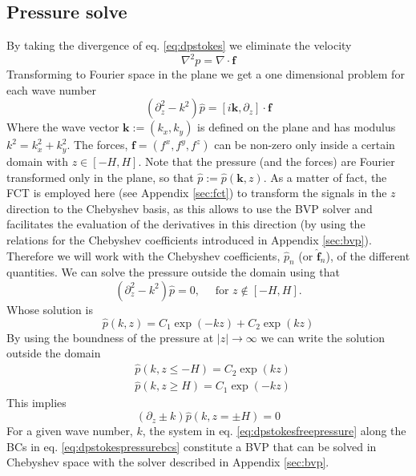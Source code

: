 \documentclass[ twoside,openright,titlepage,numbers=noenddot,%
headinclude,footinclude,cleardoublepage=empty,abstract=on,
BCOR=5mm,paper=a4,fontsize=11pt, dvipsnames
]{scrreprt}
\renewcommand{\vec}[1]{\bm{#1}}
\newcommand{\fou}[1]{\widehat{#1}}
\begin{document}
\subsection*{Pressure solve}
By taking the divergence of eq. \eqref{eq:dpstokes} we eliminate the velocity
\begin{equation}
  \label{eq:dpstokespressure}
  \nabla^2 p = \nabla\cdot\vec{f}
\end{equation}
Transforming to Fourier space in the plane we get a one dimensional problem for each wave number
\begin{equation}
  \label{eq:dpstokesfreepressure}
  (\partial^2_{z}-k^2)\fou{p} =
  \left[
    i\vec{k},
    \partial_z\right]
  \cdot\vec{f}
\end{equation}
Where the wave vector $\vec{k}:=(k_x, k_y)$ is defined on the plane and has modulus $k^2 = k_x^2 + k_y^2$. The forces, $\vec{f}=(f^x, f^y, f^z)$ can be non-zero only inside a certain domain with $z\in [-H,H]$. Note that the pressure (and the forces) are Fourier transformed only in the plane, so that $\fou{p} :=\fou{p}(\vec{k}, z)$. As a matter of fact, the \gls{FCT} is employed here (see Appendix \ref{sec:fct}) to transform the signals in the $z$ direction to the Chebyshev basis, as this allows to use the \gls{BVP} solver and facilitates the evaluation of the derivatives in this direction (by using the relations for the Chebyshev coefficients introduced in Appendix \ref{sec:bvp}). Therefore we will work with the Chebyshev coefficients, $\fou{p}_n$ (or $\fou{\vec{f}}_n$), of the different quantities. We can solve the pressure outside the domain using that
\begin{equation}
    (\partial^2_{z}-k^2)\fou{p} = 0, \quad \text{ for } z \notin [-H,H].
\end{equation}
Whose solution is
\begin{equation}
  \fou{p}(k, z) = C_1\exp(-kz) + C_2\exp(kz)
\end{equation}
By using the boundness of the pressure at $|z|\rightarrow\infty$ we can write the solution outside the domain
\begin{equation}
  \begin{aligned}
    &\fou{p}(k,z\le -H) = C_2\exp(kz)\\
    &\fou{p}(k,z\ge H) = C_1\exp(-kz)    
  \end{aligned}
\end{equation}
This implies
\begin{equation}
  \label{eq:dpstokespressurebcs}
  (\partial_z\pm k)\fou{p}(k, z=\pm H) = 0
\end{equation}
For a given wave number, $k$, the system in eq. \eqref{eq:dpstokesfreepressure} along the \glspl{BC} in eq. \eqref{eq:dpstokespressurebcs} constitute a \gls{BVP} that can be solved in Chebyshev space with the solver described in Appendix \ref{sec:bvp}.
\end{document}
